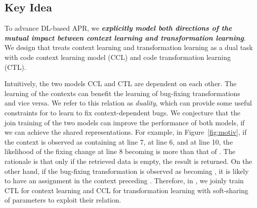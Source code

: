 \subsection{Key Idea}
\label{sec:key-idea}




To advance DL-based APR, we {\bf {\em explicitly model both directions
    of the mutual impact between context learning and transformation
    learning}}. We design {\tool} that treats context learning and
transformation learning as a dual task with code context learning
model (CCL) and code transformation learning (CTL).




Intuitively, the two models CCL and CTL are dependent on each
other. The learning of the contexts can benefit the learning of
bug-fixing transformations and vice versa. We refer to this relation
as {\em duality}, which can provide some useful constraints for
{\tool} to learn to fix context-dependent bugs. We conjecture that the
join training of the two models can improve the performance of both
models, if we can achieve the shared representations. For example, in
Figure~\ref{fig:motiv}, if the context is observed as containing
 at line 7,  at line 6, and
 at line 10, the likelihood of the fixing change
at line 8 becoming  is more than that of
. The rationale is that only if the retrieved
data is empty, the result is returned. On the other hand, if the
bug-fixing transformation is observed as 
becoming , it is likely to have an assignment
 in the context preceding .
Therefore, in {\tool}, we joinly train CTL for context learning and
CCL for transformation learning with soft-sharing of parameters to
exploit their relation.

